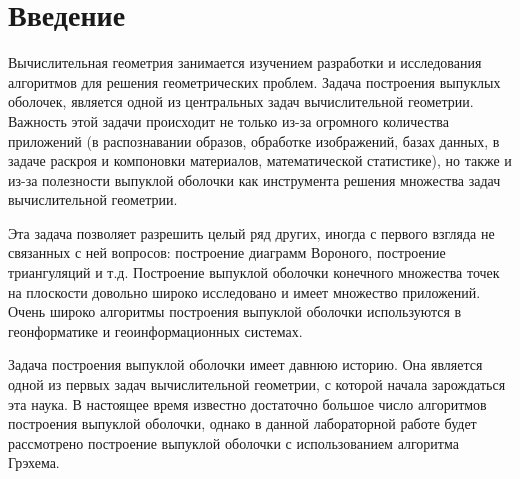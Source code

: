 \documentclass{report}
\begin{document}
\setcounter{page}{2}

\tableofcontents
\newpage

\section*{Введение}
Вычислительная геометрия занимается изучением разработки и исследования алгоритмов для решения геометрических проблем. Задача построения выпуклых оболочек, является одной из центральных задач вычислительной геометрии. Важность этой задачи происходит не только из-за огромного количества приложений (в распознавании образов, обработке изображений, базах данных, в задаче раскроя и компоновки материалов, математической статистике), но также и из-за полезности выпуклой оболочки как инструмента решения
множества задач вычислительной геометрии.

\par Эта задача позволяет разрешить целый ряд других, иногда с первого взгляда не связанных с ней вопросов: построение диаграмм Вороного, построение триангуляций и т.д. Построение выпуклой оболочки конечного множества точек на плоскости довольно широко исследовано и имеет множество приложений. Очень широко алгоритмы построения выпуклой оболочки используются в геонформатике и геоинформационных системах. 

\par Задача построения выпуклой оболочки имеет давнюю историю. Она является одной из
первых задач вычислительной геометрии, с которой начала зарождаться эта наука. В настоящее время известно достаточно большое число алгоритмов построения выпуклой оболочки, однако в данной лабораторной работе будет рассмотрено построение выпуклой оболочки с использованием алгоритма Грэхема.

\newpage

\end{document}
